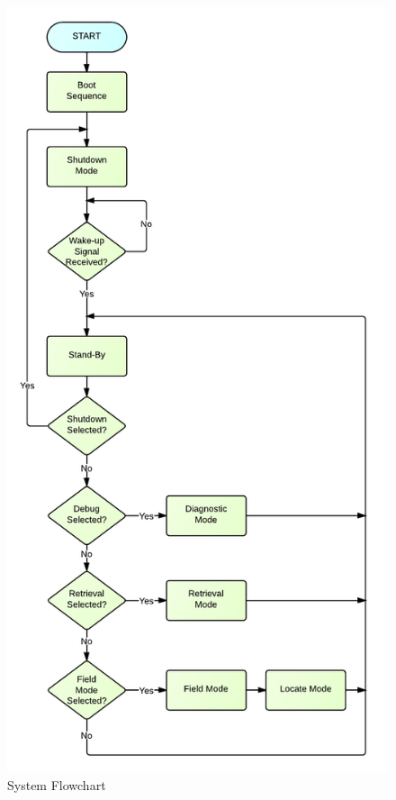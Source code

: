 \begin{figure}[H]
	\centering
	\includegraphics[scale=0.8]{img/SystemFlowchart}
	\caption{System Flowchart \label{fig:systemFlowchart}}
\end{figure}

